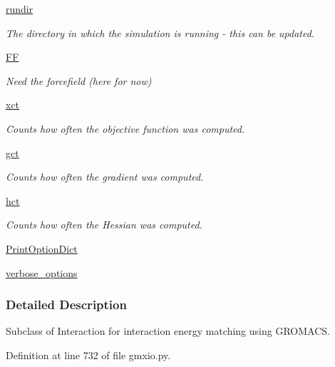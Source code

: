\begin{DoxyCompactItemize}
\hyperlink{classforcebalance_1_1target_1_1Target_a1da470037ef61c22dc44beb85cfa01a9}{rundir}
\begin{DoxyCompactList}\small\item\em \-The directory in which the simulation is running -\/ this can be updated. \end{DoxyCompactList}\item 
\hyperlink{classforcebalance_1_1target_1_1Target_a796dc30a19a60c63fb43b088d40a963f}{\-F\-F}
\begin{DoxyCompactList}\small\item\em \-Need the forcefield (here for now) \end{DoxyCompactList}\item 
\hyperlink{classforcebalance_1_1target_1_1Target_ad4cd0ab38d8fc97d3e7a6e22ce130a16}{xct}
\begin{DoxyCompactList}\small\item\em \-Counts how often the objective function was computed. \end{DoxyCompactList}\item 
\hyperlink{classforcebalance_1_1target_1_1Target_aff6e42b84dd8eb5a4dc3b47aa58bc64c}{gct}
\begin{DoxyCompactList}\small\item\em \-Counts how often the gradient was computed. \end{DoxyCompactList}\item 
\hyperlink{classforcebalance_1_1target_1_1Target_ae929918b7e695a99d7ec946d06d793e1}{hct}
\begin{DoxyCompactList}\small\item\em \-Counts how often the \-Hessian was computed. \end{DoxyCompactList}\item 
\hyperlink{classforcebalance_1_1BaseClass_afc6659278497d7245bc492ecf405ccae}{\-Print\-Option\-Dict}
\item 
\hyperlink{classforcebalance_1_1BaseClass_afd68efa29ccd2f320f4cf82198214aac}{verbose\-\_\-options}
\end{DoxyCompactItemize}


\subsubsection{\-Detailed \-Description}
\-Subclass of \-Interaction for interaction energy matching using \-G\-R\-O\-M\-A\-C\-S. 



\-Definition at line 732 of file gmxio.\-py.




